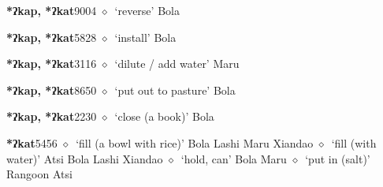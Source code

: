   \begin{list}{}{\leftmargin=1.5em \itemindent=-1.5em}
  \item {\footnotesize \textbf{*ʔkap, *ʔkat}}{\tiny 9004}
         $\diamond$~`reverse'
         Bola 
  \item {\footnotesize \textbf{*ʔkap, *ʔkat}}{\tiny 5828}
\hspace{1ex}
         $\diamond$~`install'
         Bola 
  \item {\footnotesize \textbf{*ʔkap, *ʔkat}}{\tiny 3116}
\hspace{1ex}
         $\diamond$~`dilute / add water'
         Maru 
  \item {\footnotesize \textbf{*ʔkap, *ʔkat}}{\tiny 8650}
\hspace{1ex}
         $\diamond$~`put out to pasture'
         Bola 
  \item {\footnotesize \textbf{*ʔkap, *ʔkat}}{\tiny 2230}
\hspace{1ex}
         $\diamond$~`close (a book)'
         Bola 
  \item {\footnotesize \textbf{*ʔkat}}{\tiny 5456}
\hspace{1ex}
         $\diamond$~`fill (a bowl with rice)'
         Bola 
\hspace{1ex}
         Lashi 
\hspace{1ex}
         Maru 
\hspace{1ex}
         Xiandao 
\hspace{1ex}
         $\diamond$~`fill (with water)'
         Atsi 
\hspace{1ex}
         Bola 
\hspace{1ex}
         Lashi 
\hspace{1ex}
         Xiandao 
\hspace{1ex}
         $\diamond$~`hold, can'
         Bola 
\hspace{1ex}
         Maru 
\hspace{1ex}
         $\diamond$~`put in (salt)'
         Rangoon 
\hspace{1ex}
         Atsi 

\end{list}
